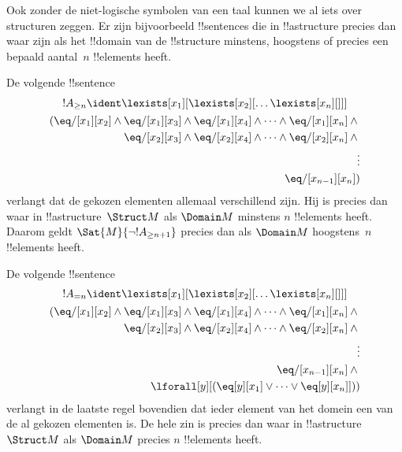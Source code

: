 \documentclass[../../../include/open-logic-section]{subfiles}
\begin{document}


\begin{explain}
Ook zonder de niet-logische symbolen van een taal kunnen we al iets
over structuren zeggen. Er zijn bijvoorbeeld !!{sentence}s die in
!!a{structure} precies dan waar zijn als het !!{domain} van de
!!{structure} minstens, hoogstens of precies een bepaald aantal~$n$
!!{element}s heeft.
\end{explain}

\begin{prop}
De volgende !!{sentence}
\begin{multline*}
  !A_{\ge n} \ident \lexists[x_1][\lexists[x_2][\dots\lexists[x_n][{}]]]\\
  \begin{aligned}
  (\eq/[x_1][x_2] \land {}
  \eq/[x_1][x_3] \land \eq/[x_1][x_4] \land \dots \land \eq/[x_1][x_n] \land {}\\
\eq/[x_2][x_3] \land \eq/[x_2][x_4] \land \dots \land {} \eq/[x_2][x_n] \land {} \\
\vdots\\
\eq/[x_{n-1}][x_n])
\end{aligned}
\end{multline*}
verlangt dat de gekozen elementen allemaal verschillend zijn. Hij is
precies dan waar in !!a{structure}~$\Struct M$ als $\Domain M$
minstens $n$ !!{element}s heeft. Daarom geldt
$\Sat{M}{\lnot !A_{\ge n+1}}$ precies dan als $\Domain M$
hoogstens~$n$ !!{element}s heeft.

\end{prop}

\begin{prop}
De volgende !!{sentence}
\begin{multline*}
!A_{= n} \ident \lexists[x_1][\lexists[x_2][\dots\lexists[x_n][{}]]] \\
\begin{aligned}
  (\eq/[x_1][x_2] \land {}
  \eq/[x_1][x_3] \land \eq/[x_1][x_4] \land \dots \land \eq/[x_1][x_n] \land {}\\
\eq/[x_2][x_3] \land \eq/[x_2][x_4] \land \dots \land {} \eq/[x_2][x_n] \land {} \\
\vdots\\
\eq/[x_{n-1}][x_n] \land {} \\
\lforall[y][(\eq[y][x_1] \lor \dots \lor \eq[y][x_n]]))
\end{aligned}
\end{multline*}
verlangt in de laatste regel bovendien dat ieder element van het
domein een van de al gekozen elementen is. De hele zin is precies dan
waar in !!a{structure}~$\Struct M$ als $\Domain M$ precies $n$
!!{element}s heeft.
\end{prop}
\end{document}
